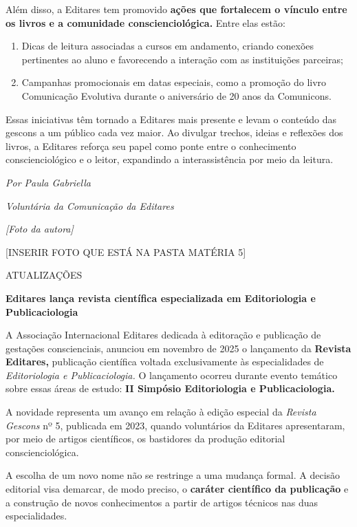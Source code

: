 Além disso, a Editares tem promovido \textbf{ações que fortalecem o vínculo entre os livros e a comunidade conscienciológica.} Entre elas estão:

\begin{enumerate}
\def\labelenumi{\arabic{enumi}.}
\item
  Dicas de leitura associadas a cursos em andamento, criando conexões pertinentes ao aluno e favorecendo a interação com as instituições parceiras;
\item
  Campanhas promocionais em datas especiais, como a promoção do livro Comunicação Evolutiva durante o aniversário de 20 anos da Comunicons.
\end{enumerate}

Essas iniciativas têm tornado a Editares mais presente e levam o conteúdo das gescons a um público cada vez maior. Ao divulgar trechos, ideias e reflexões dos livros, a Editares reforça seu papel como ponte entre o conhecimento conscienciológico e o leitor, expandindo a interassistência por meio da leitura.

\emph{Por Paula Gabriella}

\emph{Voluntária da Comunicação da Editares}

\emph{{[}Foto da autora{]}}

{[}INSERIR FOTO QUE ESTÁ NA PASTA MATÉRIA 5{]}

ATUALIZAÇÕES

\textbf{Editares lança revista científica especializada em Editoriologia e Publicaciologia}

A Associação Internacional Editares dedicada à editoração e publicação de gestações conscienciais, anunciou em novembro de 2025 o lançamento da \textbf{Revista Editares,} publicação científica voltada exclusivamente às especialidades de \emph{Editoriologia e Publicaciologia.} O lançamento ocorreu durante evento temático sobre essas áreas de estudo: \textbf{II Simpósio Editoriologia e Publicaciologia.}

A novidade representa um avanço em relação à edição especial da \emph{Revista Gescons} nº 5, publicada em 2023, quando voluntários da Editares apresentaram, por meio de artigos científicos, os bastidores da produção editorial conscienciológica.

A escolha de um novo nome não se restringe a uma mudança formal. A decisão editorial visa demarcar, de modo preciso, o \textbf{caráter científico da publicação} e a construção de novos conhecimentos a partir de artigos técnicos nas duas especialidades.

